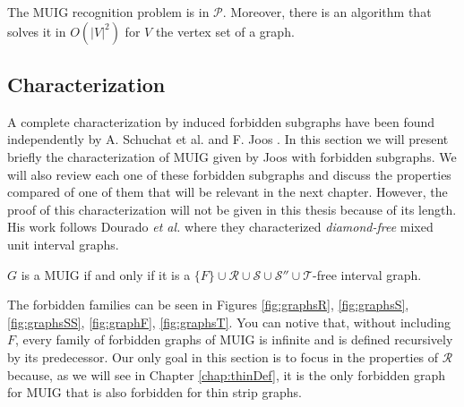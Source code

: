 \begin{theorem}
 The MUIG recognition problem is in $\mathcal{P}$. Moreover, there is an algorithm that solves it in $O(|V|^2)$ for $V$ the vertex set of a graph.
\end{theorem}


\subsection{Characterization}
\label{sec:muig_char}

A complete characterization by induced forbidden subgraphs have been found independently by A. Schuchat et al. \cite{shuchatUnitMixedInterval2014a} and F. Joos \cite{joosCharacterizationMixedUnit2013}. In this section we will present briefly the characterization of MUIG given by Joos with forbidden subgraphs. We will also review each one of these forbidden subgraphs and discuss the properties compared of one of them that will be relevant in the next chapter. However, the proof of this characterization will not be given in this thesis because of its length. His work follows Dourado \textit{et al.} \cite{douradoMixedUnitInterval2012} where they characterized \emph{diamond-free} mixed unit interval graphs.

\begin{theorem}
  $G$ is a MUIG if and only if it is a $\{F\}\cup\mathcal{R}\cup\mathcal{S}\cup\mathcal{S''}\cup\mathcal{T}$-free interval graph.
\end{theorem}

The forbidden families can be seen in Figures \ref{fig:graphsR}, \ref{fig:graphsS}, \ref{fig:graphsSS}, \ref{fig:graphF}, \ref{fig:graphsT}. You can notive that, without including $F$, every family of forbidden graphs of MUIG is infinite and is defined recursively by its predecessor. Our only goal in this section is to focus in the properties of $\mathcal{R}$ because, as we will see in Chapter \ref{chap:thinDef}, it is the only forbidden graph for MUIG that is also forbidden for thin strip graphs.


